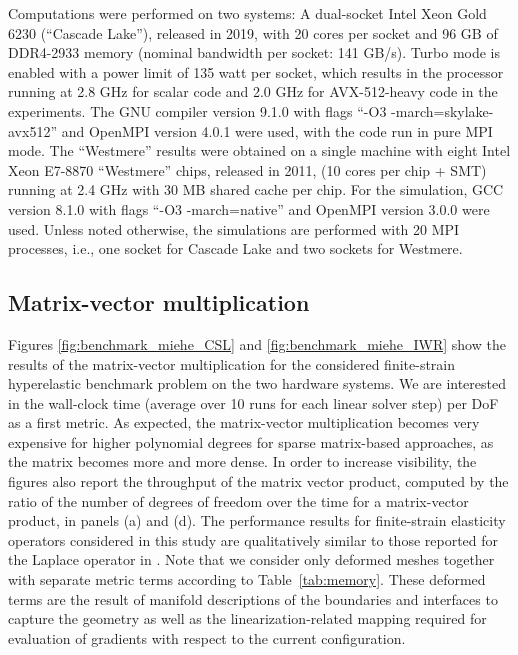 \documentclass[AMA,STIX1COL]{WileyNJD-v2}
\begin{document}
Computations were performed on two systems: A dual-socket Intel Xeon Gold 6230 (``Cascade Lake''), released in 2019,
with 20 cores per socket and 96 GB of DDR4-2933 memory (nominal bandwidth per socket: 141 GB/s).
Turbo mode is enabled with a power limit of 135 watt per socket, which results in the processor running at 2.8 GHz for scalar code and 2.0 GHz for AVX-512-heavy code in the experiments.
The GNU compiler version 9.1.0 with flags ``-O3 -march=skylake-avx512'' and OpenMPI version 4.0.1 were used, with the code run in pure MPI mode.
The {\color{red}``Westmere''} results were obtained on a single machine with eight Intel Xeon E7-8870 ``Westmere'' chips, released in 2011,
(10 cores per chip  + SMT) running at 2.4 GHz with 30 MB shared cache per chip. For the simulation, GCC version 8.1.0 with flags
``-O3 -march=native'' and OpenMPI version 3.0.0 were used.
Unless noted otherwise, the simulations are performed with 20 MPI processes, i.e., one socket for Cascade Lake and two sockets for {\color{red}Westmere}.

\subsection{Matrix-vector multiplication}

Figures \ref{fig:benchmark_miehe_CSL} and \ref{fig:benchmark_miehe_IWR} show the results of the matrix-vector multiplication for the considered finite-strain hyperelastic benchmark problem on the two hardware systems.
We are interested in the wall-clock time (average over 10 runs for each linear solver step) per DoF as a first metric.
As expected, the matrix-vector multiplication becomes very expensive for higher polynomial degrees for sparse matrix-based approaches,
as the matrix becomes more and more dense.
In order to increase visibility, the figures also report the throughput of the matrix vector product,
computed by the ratio of the number of degrees of freedom over the time for a matrix-vector product, in panels (a) and (d).
The performance results for finite-strain elasticity operators considered in this study are qualitatively similar to those reported for the Laplace operator in \cite{kronbichler12}.
Note that we consider only deformed meshes together with separate metric terms according to Table~\ref{tab:memory}.
These deformed terms are the result of manifold descriptions of the boundaries and interfaces  to capture the geometry as well as
the linearization-related mapping required for evaluation of gradients with respect to the current configuration.
\end{document}
